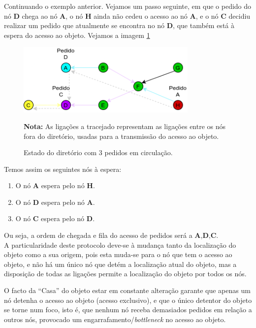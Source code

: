 Continuando o exemplo anterior. Vejamos um passo seguinte, em que o pedido do nó \textbf{D} chega ao nó \textbf{A}, o nó \textbf{H} ainda não cedeu o acesso ao nó \textbf{A}, e o nó \textbf{C} decidiu realizar um pedido que atualmente se encontra no nó \textbf{D}, que também está à espera do acesso ao objeto. Vejamos a imagem \ref{motivacao:img:3_pedidos}

\begin{figure}[!htb]
\centering
\includegraphics[width=250pt]{fila.png}
\caption{Estado do diretório com 3 pedidos em circulação.}
\label{motivacao:img:3_pedidos}
\textbf{Nota:} As ligações a tracejado representam as ligações entre os nós fora do diretório, usadas para a transmissão do acesso ao objeto.
\end{figure}


Temos assim os seguintes nós à espera:
\begin{enumerate}
    \item O nó \textbf{A} espera pelo nó \textbf{H}.
    \item O nó \textbf{D} espera pelo nó \textbf{A}.
    \item O nó \textbf{C} espera pelo nó \textbf{D}.
\end{enumerate}
Ou seja, a ordem de chegada e fila do acesso de pedidos será a \textbf{A},\textbf{D},\textbf{C}. \\


 

A particularidade deste protocolo deve-se à mudança tanto da localização do objeto como a sua origem, pois esta muda-se para o nó que tem o acesso ao objeto, e não há um único nó que detém a localização atual do objeto, mas a disposição de todas as ligações permite a localização do objeto por todos os nós.

O facto da ``Casa'' do objeto estar em constante alteração garante que apenas um nó detenha o acesso ao objeto (acesso exclusivo), e que o único detentor do objeto se torne num foco, isto é, que nenhum nó receba demasiados pedidos em relação a outros nós, provocado um engarrafamento/\emph{bottleneck} no acesso ao objeto.


